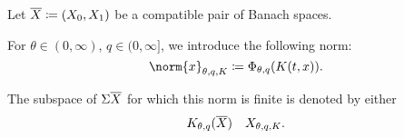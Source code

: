 \begin{definition}\label{def:k_functional_interpolation_space}
  Let \( \oline{X} \coloneqq ( X_0, X_1 ) \) be a compatible pair of Banach spaces.

  For \( \theta \in (0, \infty) \), \( q \in (0, \infty] \), we introduce the following norm:
  \begin{equation}\label{eq:def:k_functional_interpolation_space/norm}
    \norm{x}_{\theta,q,K} \coloneqq \Phi_{\theta,q}(K(t, x)).
  \end{equation}

  The subspace of \( \Sigma\oline{X} \) for which this norm is finite is denoted by either
  \begin{align*}
    K_{\theta,q}(\oline{X})
    &&
    X_{\theta,q,K}.
  \end{align*}
\end{definition}

